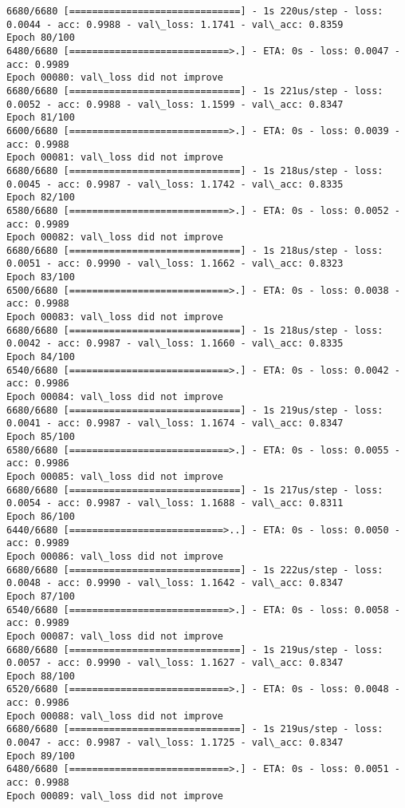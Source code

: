 \documentclass[11pt]{article}
\begin{document}
\begin{Verbatim}[commandchars=\\\{\}]
6680/6680 [==============================] - 1s 220us/step - loss: 0.0044 - acc: 0.9988 - val\_loss: 1.1741 - val\_acc: 0.8359
Epoch 80/100
6480/6680 [============================>.] - ETA: 0s - loss: 0.0047 - acc: 0.9989
Epoch 00080: val\_loss did not improve
6680/6680 [==============================] - 1s 221us/step - loss: 0.0052 - acc: 0.9988 - val\_loss: 1.1599 - val\_acc: 0.8347
Epoch 81/100
6600/6680 [============================>.] - ETA: 0s - loss: 0.0039 - acc: 0.9988
Epoch 00081: val\_loss did not improve
6680/6680 [==============================] - 1s 218us/step - loss: 0.0045 - acc: 0.9987 - val\_loss: 1.1742 - val\_acc: 0.8335
Epoch 82/100
6580/6680 [============================>.] - ETA: 0s - loss: 0.0052 - acc: 0.9989
Epoch 00082: val\_loss did not improve
6680/6680 [==============================] - 1s 218us/step - loss: 0.0051 - acc: 0.9990 - val\_loss: 1.1662 - val\_acc: 0.8323
Epoch 83/100
6500/6680 [============================>.] - ETA: 0s - loss: 0.0038 - acc: 0.9988
Epoch 00083: val\_loss did not improve
6680/6680 [==============================] - 1s 218us/step - loss: 0.0042 - acc: 0.9987 - val\_loss: 1.1660 - val\_acc: 0.8335
Epoch 84/100
6540/6680 [============================>.] - ETA: 0s - loss: 0.0042 - acc: 0.9986
Epoch 00084: val\_loss did not improve
6680/6680 [==============================] - 1s 219us/step - loss: 0.0041 - acc: 0.9987 - val\_loss: 1.1674 - val\_acc: 0.8347
Epoch 85/100
6580/6680 [============================>.] - ETA: 0s - loss: 0.0055 - acc: 0.9986
Epoch 00085: val\_loss did not improve
6680/6680 [==============================] - 1s 217us/step - loss: 0.0054 - acc: 0.9987 - val\_loss: 1.1688 - val\_acc: 0.8311
Epoch 86/100
6440/6680 [===========================>..] - ETA: 0s - loss: 0.0050 - acc: 0.9989
Epoch 00086: val\_loss did not improve
6680/6680 [==============================] - 1s 222us/step - loss: 0.0048 - acc: 0.9990 - val\_loss: 1.1642 - val\_acc: 0.8347
Epoch 87/100
6540/6680 [============================>.] - ETA: 0s - loss: 0.0058 - acc: 0.9989
Epoch 00087: val\_loss did not improve
6680/6680 [==============================] - 1s 219us/step - loss: 0.0057 - acc: 0.9990 - val\_loss: 1.1627 - val\_acc: 0.8347
Epoch 88/100
6520/6680 [============================>.] - ETA: 0s - loss: 0.0048 - acc: 0.9986
Epoch 00088: val\_loss did not improve
6680/6680 [==============================] - 1s 219us/step - loss: 0.0047 - acc: 0.9987 - val\_loss: 1.1725 - val\_acc: 0.8347
Epoch 89/100
6480/6680 [============================>.] - ETA: 0s - loss: 0.0051 - acc: 0.9988
Epoch 00089: val\_loss did not improve

\end{Verbatim}
\end{document}
